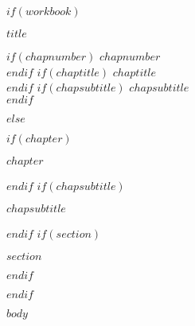 \documentclass[letterpaper,10pt,twoside]{article}
\begin{document}
\thispagestyle{empty}

$if(workbook)$
\begin{center}
{\titlefont\bfseries\large{$title$}\\}
\vspace{-1em}
\hrulefill\par
$if(chapnumber)$
{\sffamily\bfseries\normalsize{$chapnumber$}\\}
$endif$
$if(chaptitle)$
{\sffamily\bfseries\Large{$chaptitle$}\\}
$endif$
$if(chapsubtitle)$
{\rmfamily\itshape\large{$chapsubtitle$}\\}
$endif$
\end{center}
\vspace{-.5em}

$else$
\begin{center}
$if(chapter)$
{\titlefont\LARGE{$chapter$}\par}
$endif$
$if(chapsubtitle)$
\vspace{.5em}
{\titlefont\Large{$chapsubtitle$}\par}
$endif$
$if(section)$
\vspace{.5em}
{\titlefont\Large{$section$}\par}
$endif$
\end{center}
\singlespacing
$endif$


$body$
\end{document}

